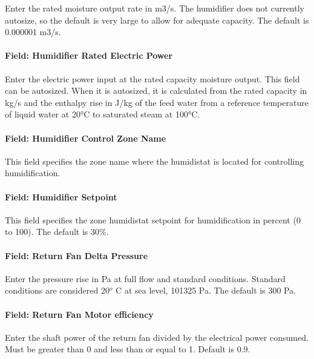 Enter the rated moisture output rate in m3/s. The humidifier does not currently autosize, so the default is very large to allow for adequate capacity. The default is 0.000001 m3/s.

\paragraph{Field: Humidifier Rated Electric Power}\label{field-humidifier-rated-electric-power-1}

Enter the electric power input at the rated capacity moisture output. This field can be autosized. When it is autosized, it is calculated from the rated capacity in kg/s and the enthalpy rise in J/kg of the feed water from a reference temperature of liquid water at 20°C to saturated steam at 100°C.

\paragraph{Field: Humidifier Control Zone Name}\label{field-humidifier-control-zone-name-1}

This field specifies the zone name where the humidistat is located for controlling humidification.

\paragraph{Field: Humidifier Setpoint}\label{field-humidifier-setpoint-1}

This field specifies the zone humidistat setpoint for humidification in percent (0 to 100). The default is 30\%.

\paragraph{Field: Return Fan Delta Pressure}\label{field-return-fan-delta-pressure-1}

Enter the pressure rise in Pa at full flow and standard conditions. Standard conditions are considered 20\(^{o}\) C at sea level, 101325 Pa. The default is 300 Pa.

\paragraph{Field: Return Fan Motor efficiency}\label{field-return-fan-motor-efficiency-1}

Enter the shaft power of the return fan divided by the electrical power consumed. Must be greater than 0 and less than or equal to 1. Default is 0.9.

